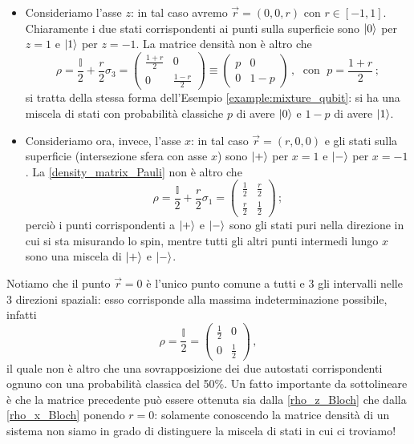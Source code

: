 \begin{itemize}
    \item Consideriamo l'asse $z$: in tal caso avremo $\vec{r} = (0, 0, r)$ con $r \in [-1, 1]$. Chiaramente i due stati corrispondenti ai punti sulla superficie sono $\ket{0}$ per $z=1$ e $\ket{1}$ per $z = -1$. La matrice densità non è altro che
    \begin{equation}\label{rho_z_Bloch}
        \rho = \frac{\mathbb{I}}{2} + \frac{r}{2} \sigma_3 = 
        \begin{pmatrix}
            \frac{1+r}{2} & 0 \\ 0 & \frac{1-r}{2}
        \end{pmatrix}
        \equiv
        \begin{pmatrix}
            p & 0 \\ 0 & 1-p
        \end{pmatrix} \, , \; \text{ con } \; p = \frac{1+r}{2} \, ;
    \end{equation}
    si tratta della stessa forma dell'Esempio \ref{example:mixture_qubit}: si ha una miscela di stati con probabilità classiche $p$ di avere $\ket{0}$ e $1-p$ di avere $\ket{1}$. 
    
    \item Consideriamo ora, invece, l'asse $x$: in tal caso $\vec{r} = (r, 0, 0)$ e gli stati sulla superficie (intersezione sfera con asse $x$) sono $\ket{+}$ per $x = 1$ e $\ket{-}$ per $x = -1$. La \eqref{density_matrix_Pauli} non è altro che
    \begin{equation}\label{rho_x_Bloch}
        \rho = \frac{\mathbb{I}}{2} + \frac{r}{2} \sigma_1 =
        \begin{pmatrix}
            \frac{1}{2} & \frac{r}{2} \\ \frac{r}{2} & \frac{1}{2}
        \end{pmatrix} \, ;
    \end{equation}
    perciò i punti corrispondenti a $\ket{+}$ e $\ket{-}$ sono gli stati puri nella direzione in cui si sta misurando lo spin, mentre tutti gli altri punti intermedi lungo $x$ sono una miscela di $\ket{+}$ e $\ket{-}$. 
\end{itemize}

\noindent Notiamo che il punto $\vec{r} = 0$ è l'unico punto comune a tutti e 3 gli intervalli nelle 3 direzioni spaziali: esso corrisponde alla massima indeterminazione possibile, infatti
\begin{equation*}
    \rho = \frac{\mathbb{I}}{2} = 
    \begin{pmatrix}
        \frac{1}{2} & 0 \\ 0 & \frac{1}{2}
    \end{pmatrix} \, ,
\end{equation*}
il quale non è altro che una sovrapposizione dei due autostati corrispondenti ognuno con una probabilità classica del 50\%. Un fatto importante da sottolineare è che la matrice precedente può essere ottenuta sia dalla \eqref{rho_z_Bloch} che dalla \eqref{rho_x_Bloch} ponendo $r = 0$: solamente conoscendo la matrice densità di un sistema non siamo in grado di distinguere la miscela di stati in cui ci troviamo!

